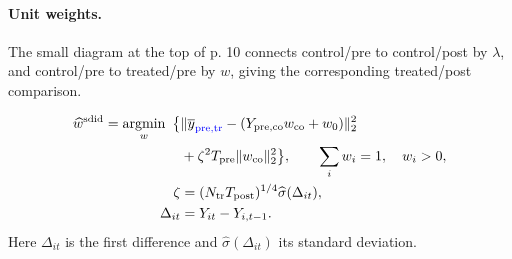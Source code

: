 \documentclass[11pt,a4paper]{article}
\begin{document}
\paragraph{Unit weights.}
The small diagram at the top of p. 10 connects control/pre to control/post by \(\lambda\), and control/pre to treated/pre by \(w\), giving the corresponding treated/post comparison.
\begin{center}
\end{center}
\begin{align*}
\widehat w^{\mathrm{sdid}}
=\operatorname*{argmin}_{w}\ \big\{
&\|\overline y_{\textcolor{blue}{\mathrm{pre,tr}}}
-(Y_{\mathrm{pre,co}}w_{\mathrm{co}}+w_0)\|_2^2\\
&+\zeta^2T_{\mathrm{pre}}\|w_{\mathrm{co}}\|_2^2\big\},
\qquad \sum_iw_i=1,\quad w_i>0,\\
\zeta&=(N_{\mathrm{tr}}T_{\mathrm{post}})^{1/4}
\widehat\sigma(\Delta_{it}),\\
\Delta_{it}&=Y_{it}-Y_{i,t-1}.
\end{align*}
Here \(\Delta_{it}\) is the first difference and \(\widehat\sigma(\Delta_{it})\) its standard deviation.
\end{document}

